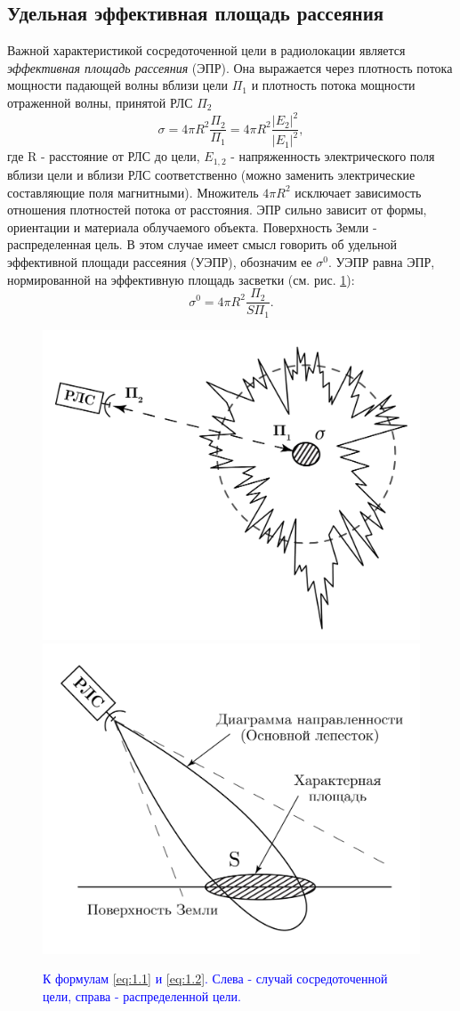 \subsection{Удельная эффективная площадь рассеяния} 
Важной характеристикой сосредоточенной цели в радиолокации является \textit{эффективная площадь рассеяния}
(ЭПР)\cite{meln}. Она выражается через плотность потока мощности падающей волны вблизи цели $\Pi_1$ и плотность потока
мощности отраженной
волны, принятой РЛС $\Pi_2$
\begin{equation}
  \sigma =  4 \pi R^2 \frac{\Pi_2}{\Pi_1} = 4 \pi R^2 \frac{|E_2|^2}{|E_1|^2},
  \label{eq:1.1}
\end{equation}
где R - расстояние от РЛС до цели, $E_{1,2}$ - напряженность электрического поля вблизи цели и вблизи РЛС соответственно
(можно заменить электрические составляющие поля магнитными). Множитель $4 \pi R^2$  исключает зависимость отношения
плотностей потока от
расстояния. ЭПР сильно зависит от формы, ориентации и материала облучаемого объекта. 
Поверхность Земли - распределенная цель. В этом случае имеет смысл говорить об удельной эффективной площади рассеяния
(УЭПР), обозначим ее $\sigma^0$. УЭПР равна ЭПР, нормированной на эффективную площадь засветки (см. рис. \ref{fig:1}):
\begin{equation}
  \sigma^0 = 4 \pi R^2 \frac{\Pi_2}{S\Pi_1}.
  \label{eq:1.2}
\end{equation}

\begin{figure}[h!]
  \centering
  \includegraphics[width = .49\linewidth]{img/rls.pdf}
  \includegraphics[width = .49\linewidth]{img/rls2.pdf}
  \caption{\textcolor{blue}{К формулам \eqref{eq:1.1} и \eqref{eq:1.2}. Слева - случай сосредоточенной цели, справа - распределенной цели.}}
  \label{fig:1}
\end{figure}

